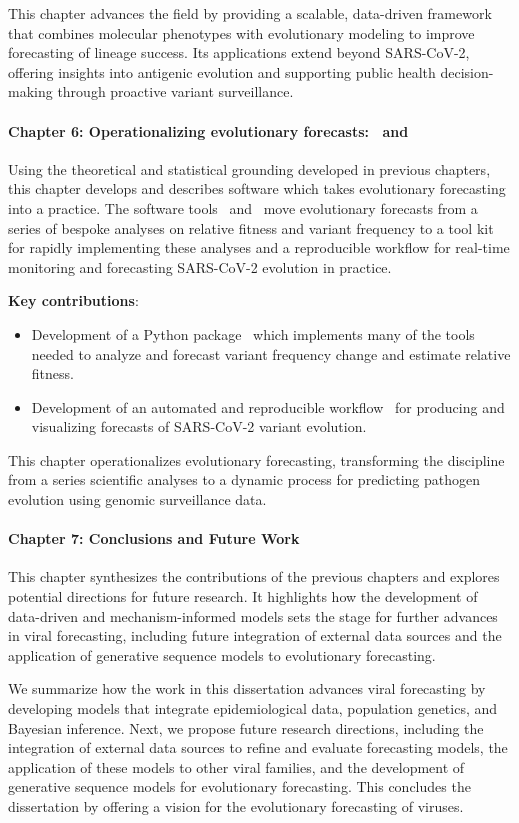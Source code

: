 This chapter advances the field by providing a scalable, data-driven framework that combines molecular phenotypes with evolutionary modeling to improve forecasting of lineage success.
Its applications extend beyond SARS-CoV-2, offering insights into antigenic evolution and supporting public health decision-making through proactive variant surveillance.

\paragraph{Chapter 6: Operationalizing evolutionary forecasts: \evofr\ and \forecastsNcov}

Using the theoretical and statistical grounding developed in previous chapters, this chapter develops and describes software which takes evolutionary forecasting into a practice.
The software tools \evofr\ and \forecastsNcov\ move evolutionary forecasts from a series of bespoke analyses on relative fitness and variant frequency to a tool kit for rapidly implementing these analyses and a reproducible workflow for real-time monitoring and forecasting SARS-CoV-2 evolution in practice.

\noindent\textbf{Key contributions}:
\begin{itemize}
  \item Development of a Python package \evofr\ which implements many of the tools needed to analyze and forecast variant frequency change and estimate relative fitness.
  \item Development of an automated and reproducible workflow \forecastsNcov\ for producing and visualizing forecasts of SARS-CoV-2 variant evolution.
\end{itemize}

This chapter operationalizes evolutionary forecasting, transforming the discipline from a series scientific analyses to a dynamic process for predicting pathogen evolution using genomic surveillance data.

\paragraph{Chapter 7: Conclusions and Future Work}

This chapter synthesizes the contributions of the previous chapters and explores potential directions for future research.
It highlights how the development of data-driven and mechanism-informed models sets the stage for further advances in viral forecasting, including future integration of external data sources and the application of generative sequence models to evolutionary forecasting.

We summarize how the work in this dissertation advances viral forecasting by developing models that integrate epidemiological data, population genetics, and Bayesian inference.
Next, we propose future research directions, including the integration of external data sources to refine and evaluate forecasting models, the application of these models to other viral families, and the development of generative sequence models for evolutionary forecasting.
This concludes the dissertation by offering a vision for the evolutionary forecasting of viruses.

